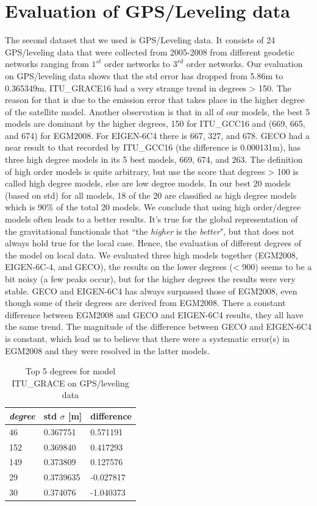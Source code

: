         \section{Evaluation of GPS/Leveling data}
        The second dataset that we used is GPS/Leveling data. It consists of 24 GPS/leveling data that were collected from 2005-2008 from different geodetic networks ranging from $1^{st}$ order networks to $3^{rd}$ order networks. Our evaluation on GPS/leveling data shows that the std error has dropped from 5.86m to 0.365349m. ITU\_GRACE16 had a very strange trend in degrees > 150. The reason for that is due to the emission error that takes place in the higher degree of the satellite model.
        Another observation is that in all of our models, the best 5 models are dominant by the higher degrees, 150 for ITU\_GCC16 and (669, 665, and 674) for EGM2008. For EIGEN-6C4 there is 667, 327, and 678. GECO had a near result to that recorded by ITU\_GCC16 (the difference is 0.000131m), has three high degree models in its 5 best models, 669, 674, and 263. The definition of high order models is quite arbitrary, but use the score that degrees > 100 is called high degree models, else are low degree models. In our best 20 models (based on std) for all models, 18 of the 20 are classified as high degree models which is 90\% of the total 20 models. We conclude that using high order/degree models often leads to a better results. It's true for the global representation of the gravitational functionals that ``the \textit{higher} is the \textit{better}", but that does not always hold true for the local case. Hence, the evaluation of different degrees of the model on local data. We evaluated three high models together (EGM2008, EIGEN-6C-4, and GECO), the results on the lower degrees (< 900) seems to be a bit noisy (a few peaks occur), but for the higher degrees the results were very stable. GECO and EIGEN-6C4 has always surpassed those of EGM2008, even though some of their degrees are derived from EGM2008. There a constant difference between EGM2008 and GECO and EIGEN-6C4 results, they all have the same trend. The magnitude of the difference between GECO and EIGEN-6C4 is constant, which lead us to believe that there were a systematic error(s) in EGM2008 and they were resolved in the latter models. 
          \begin{table}[]
          	\centering
          	\caption{Top 5 degrees for model ITU\_GRACE on GPS/leveling data}
          	\label{table:ggm_models}
          	\begin{tabular}{@{}lll@{}}
          		\toprule
          		\emph{degree} & std $\sigma$ [m]  & difference\\ \midrule
          		46 &0.367751&    0.571191\\
          		152 &0.369840&   0.417293\\
          		149 &0.373809 &  0.127576\\
          		29 &0.3739635 &  -0.027817\\
          		30 &0.374076  & -1.040373\\
          		\bottomrule
          		
          	\end{tabular}
          \end{table}
          
